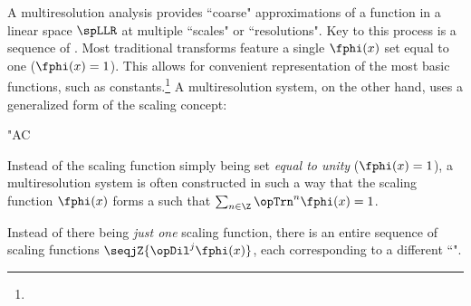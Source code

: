 A multiresolution analysis provides ``coarse" approximations of a function in a linear space $\spLLR$ at multiple
``scales" or ``resolutions".
Key to this process is a sequence of .
Most traditional transforms feature a single  $\fphi(x)$
set equal to one ($\fphi(x)=1$).
This allows for convenient representation of the most basic functions, such as constants.\footnote{}
A multiresolution system, on the other hand, uses a generalized form of the scaling concept:
\begin{dingautolist}{"AC}
  \item Instead of the scaling function simply being set \emph{equal to unity} ($\fphi(x)=1$),
        a multiresolution system  is often constructed in such a way that the scaling function 
        $\fphi(x)$ forms a  such that
        $\sum_{n\in\Z} \opTrn^n\fphi(x) = 1$.
  \item Instead of there being \emph{just one} scaling function, there
        is an entire sequence of scaling functions $\seqjZ{\opDil^j\fphi(x)}$, 
        each corresponding to a different ``".
\end{dingautolist}


